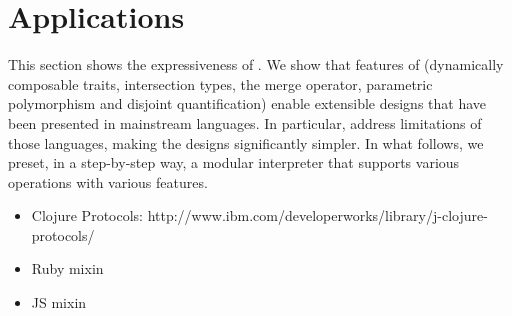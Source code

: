\section{Applications}



This section shows the expressiveness of \name. We show that features of \name
(dynamically composable traits, intersection types, the merge operator,
parametric polymorphism and disjoint quantification) enable extensible designs
that have been presented in mainstream languages. In particular, \name address
limitations of those languages, making the designs significantly simpler. In
what follows, we preset, in a step-by-step way, a modular interpreter that
supports various operations with various features.



\begin{itemize}
\item Clojure Protocols: http://www.ibm.com/developerworks/library/j-clojure-protocols/
\item Ruby mixin
\item JS mixin
\end{itemize}